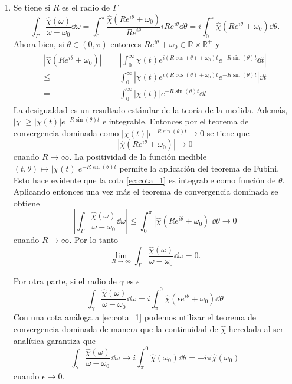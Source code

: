 \documentclass{article}
\begin{document}
\begin{enumerate}
\item Se tiene si $R$ es el radio de $\Gamma$
\begin{equation}
\int_\Gamma\frac{\hat{\chi}(\omega)}{\omega-\omega_0}\dd{\omega}=\int_0^\pi\frac{\hat{\chi}(Re^{i\theta}+\omega_0)}{Re^{i\theta}}iRe^{i\theta}\dd{\theta}=i\int_0^\pi\hat{\chi}(Re^{i\theta}+\omega_0)\dd{\theta}.
\end{equation}
Ahora bien, si $\theta\in(0,\pi)$ entonces $Re^{i\theta}+\omega_0\in\mathbb{R}\times\mathbb{R}^+$ y
\begin{align}\label{ec:cota_1}
\begin{split}
\left|\hat{\chi}(Re^{i\theta}+\omega_0)\right|=&\left|\int_0^\infty\chi(t)e^{i(R\cos(\theta)+\omega_0)t}e^{-R\sin(\theta)t}\dd{t}\right|\\
\leq&\int_0^\infty\left|\chi(t)e^{i(R\cos(\theta)+\omega_0)t}e^{-R\sin(\theta)t}\right|\dd{t}\\
=&\int_0^\infty\left|\chi(t)\right|e^{-R\sin(\theta)t}\dd{t}
\end{split}
\end{align}
La desigualdad es un resultado estándar de la teoría de la medida\cite{Rudin1976}. Además, $\left|\chi\right|\geq\left|\chi(t)\right|e^{-R\sin(\theta)t}$ e integrable. Entonces por el teorema de convergencia dominada\cite{Rudin1976} como $\left|\chi(t)\right|e^{-R\sin(\theta)t}\rightarrow 0$ se tiene que 
\begin{equation}
\left|\hat{\chi}(Re^{i\theta}+\omega_0)\right|\rightarrow 0
\end{equation}
cuando $R\rightarrow\infty$. La positividad de la función medible $(t,\theta)\mapsto\left|\chi(t)\right|e^{-R\sin(\theta)t}$ permite la aplicación del teorema de Fubini\cite{Rudin1987}. Esto hace evidente que la cota \eqref{ec:cota_1} es integrable como función de $\theta$. Aplicando entonces una vez más el teorema de convergencia dominada se obtiene
\begin{equation}
\left|\int_\Gamma\frac{\hat{\chi}(\omega)}{\omega-\omega_0}\dd{\omega}\right|\leq\int_0^\pi\left|\hat{\chi}(Re^{i\theta}+\omega_0)\right|\dd{\theta}\rightarrow 0
\end{equation}
cuando $R\rightarrow\infty$. Por lo tanto
\begin{equation}
\lim_{R\rightarrow\infty}\int_\Gamma\frac{\hat{\chi}(\omega)}{\omega-\omega_0}\dd{\omega}=0.
\end{equation}

Por otra parte, si el radio de $\gamma$ es $\epsilon$
\begin{equation}
\int_\gamma\frac{\hat{\chi}(\omega)}{\omega-\omega_0}\dd{\omega}=i\int_\pi^0\hat{\chi}(\epsilon e^{i\theta}+\omega_0)\dd{\theta}
\end{equation}
Con una cota análoga a \eqref{ec:cota_1} podemos utilizar el teorema de convergencia dominada de manera que la continuidad de $\hat{\chi}$ heredada al ser analítica garantiza que 
\begin{equation}
\int_\gamma\frac{\hat{\chi}(\omega)}{\omega-\omega_0}\dd{\omega}\rightarrow i\int_\pi^0\hat{\chi}(\omega_0)\dd{\theta}=-i\pi\hat{\chi}(\omega_0)
\end{equation}
cuando $\epsilon\rightarrow 0$.


\end{enumerate}
\end{document}
